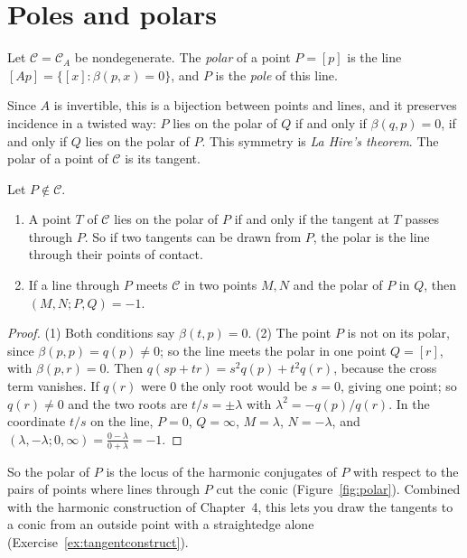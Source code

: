 \section{Poles and polars}

\begin{definition}
Let $\mathcal C=\mathcal C_A$ be nondegenerate. The \emph{polar} of a point $P=[p]$ is the line $[Ap]=\{[x]:\beta(p,x)=0\}$, and $P$ is the \emph{pole} of
this line.
\end{definition}

Since $A$ is invertible, this is a bijection between points and lines, and it preserves incidence in a twisted way: $P$ lies on the polar of $Q$
if and only if $\beta(q,p)=0$, if and only if $Q$ lies on the polar of $P$. This symmetry is \emph{La Hire's theorem}. The polar of a point of
$\mathcal C$ is its tangent.

\begin{proposition}\label{prop:polar}
Let $P\notin\mathcal C$.
\begin{enumerate}
\item A point $T$ of $\mathcal C$ lies on the polar of $P$ if and only if the tangent at $T$ passes through $P$. So if two tangents can be drawn from
$P$, the polar is the line through their points of contact.
\item If a line through $P$ meets $\mathcal C$ in two points $M,N$ and the polar of $P$ in $Q$, then $(M,N;P,Q)=-1$.
\end{enumerate}
\end{proposition}

\begin{proof}
(1) Both conditions say $\beta(t,p)=0$. (2) The point $P$ is not on its polar, since $\beta(p,p)=q(p)\ne0$; so the line meets the polar in one point
$Q=[r]$, with $\beta(p,r)=0$. Then $q(sp+tr)=s^2q(p)+t^2q(r)$, because the cross term vanishes. If $q(r)$ were $0$ the only root would be $s=0$,
giving one point; so $q(r)\ne0$ and the two roots are $t/s=\pm\lambda$ with $\lambda^2=-q(p)/q(r)$. In the coordinate $t/s$ on the line, $P=0$, $Q=\infty$,
$M=\lambda$, $N=-\lambda$, and $(\lambda,-\lambda;0,\infty)=\frac{0-\lambda}{0+\lambda}=-1$.
\end{proof}

So the polar of $P$ is the locus of the harmonic conjugates of $P$ with respect to the pairs of points where lines through $P$ cut the conic
(Figure~\ref{fig:polar}). Combined with the harmonic construction of Chapter~4, this lets you draw the tangents to a conic from an outside point
with a straightedge alone (Exercise~\ref{ex:tangentconstruct}).

